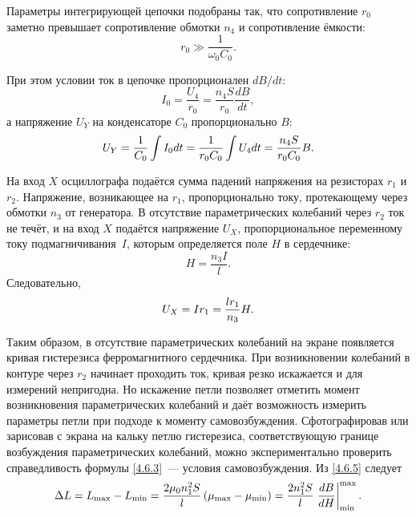 Параметры интегрирующей цепочки подобраны так, что сопротивление $r_0$ заметно
превышает сопротивление обмотки $n_4$ и сопротивление ёмкости:
\begin{equation*}
	r_0 \gg \frac{1}{\omega_0C_0}.
\end{equation*}

 При этом условии ток в цепочке пропорционален $dB/dt$:
\begin{equation*}
	I_0 = \frac{U_4}{r_0} = \frac{n_4S}{r_0}\frac{dB}{dt},
\end{equation*}
а напряжение $U_Y$ на конденсаторе $C_0$ пропорционально $B$:
\begin{equation}
	\eqmark{4.6.6}
	U_Y = \frac{1}{C_0}\int I_0dt = \frac{1}{r_0C_0}\int U_4dt =
\frac{n_4S}{r_0C_0}B.
\end{equation}

На вход $X$ осциллографа подаётся сумма падений напряжения на резисторах $r_1$ и
$r_2$. Напряжение, возникающее на $r_1$, пропорционально току, протекающему
через обмотки $n_3$ от генератора. В отсутствие параметрических колебаний через
$r_2$ ток не течёт, и на вход $X$ подаётся напряжение $U_X$, пропорциональное
переменному току подмагничивания~$I$, которым определяется поле $H$ в
сердечнике:
\begin{equation*}
	H = \frac{n_3I}{l}.
\end{equation*}
Следовательно,
\begin{equation}
	\eqmark{4.6.7}
	U_X = Ir_1 = \frac{lr_1}{n_3}H.
\end{equation}

Таким образом, в отсутствие параметрических колебаний на экране появляется
кривая гистерезиса ферромагнитного сердечника. При возникновении колебаний в
контуре через $r_2$ начинает проходить ток, кривая резко искажается и для
измерений непригодна. Но искажение петли позволяет отметить момент возникновения
параметрических колебаний и даёт возможность измерить параметры петли при
подходе к моменту самовозбуждения. Сфотографировав или зарисовав с экрана на кальку петлю
гистерезиса, соответствующую границе возбуждения параметрических колебаний,
можно экспериментально проверить справедливость формулы \eqref{4.6.3}~---
условия самовозбуждения. Из \eqref{4.6.5} следует
\begin{equation}
	\eqmark{4.6.8}
		\Delta L = L_{\rm max} - L_{\rm min} =
        \frac{2\mu_0n^2_1S}{l}\left(\mu_{\rm max} - \mu_{\rm min}\right)
		= \frac{2n^2_1S}{l}
        \left.\frac{dB}{dH}\right|_{\rm min}^{\rm max}.
\end{equation}

